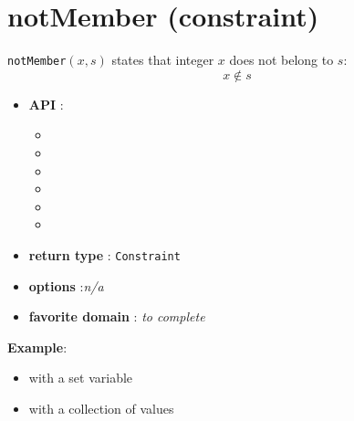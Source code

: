 \label{notmember}
\hypertarget{notmember}{}

\section{notMember (constraint)}\label{notmember:notmemberconstraint}\hypertarget{notmember:notmemberconstraint}{}
\begin{notedef}
\texttt{notMember}$(x,s)$ states that integer $x$ does not belong to $s$:
$$x\not\in s$$  
\end{notedef}

\begin{itemize}
	\item \textbf{API} :
	\begin{itemize}
		\item {}
		\item {}
		\item {}
		\item {}
		\item {}
		\item {}
	\end{itemize}
	\item \textbf{return type} : \texttt{Constraint}
	\item \textbf{options} :\emph{n/a}
	\item \textbf{favorite domain} : \emph{to complete}
\end{itemize}

\textbf{Example}:
\begin{itemize}
\item with a set variable
\end{itemize}


\begin{itemize}
\item with a collection of values
\end{itemize}

